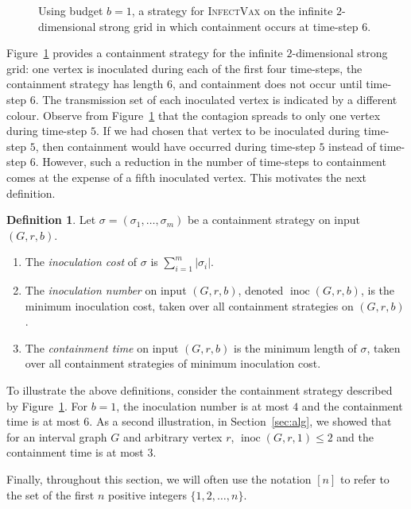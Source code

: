 \documentclass[unknownkeysallowed]{article}
\theoremstyle{definition}\newtheorem{strategy}{Strategy}
\newtheorem{definition}[theorem]{Definition}
\theoremstyle{definition}\newtheorem{notation}{Notation}[theorem]
\newcommand*{\IV}{\textup{\textsc{InfectVax}}\xspace}
\DeclareMathOperator{\inoc}{inoc}
\begin{document}
\begin{figure}[htb]
\begin{center}
\begin{tikzpicture}[line cap=round, line join=round,scale=0.7]
  

\end{tikzpicture}
\end{center}
\caption{Using budget $b=1$, a strategy for \IV on the infinite $2$-dimensional strong grid in which containment occurs at time-step $6$.} 
\label{fig:StrongGrid}
\end{figure} 
  
Figure~\ref{fig:StrongGrid} provides a containment strategy for the infinite $2$-dimensional strong grid: one vertex is inoculated during each of the first four time-steps, the containment strategy has length $6$, and containment does not occur until time-step $6$. The transmission set of each inoculated vertex is indicated by a different colour.
Observe from Figure~\ref{fig:StrongGrid} that the contagion spreads to only one vertex during time-step $5$.  If we had chosen that vertex to be inoculated during time-step $5$, then containment would have occurred during time-step $5$ instead of time-step $6$.  However, such a reduction in the number of time-steps to containment comes at the expense of a fifth inoculated vertex.  This motivates the next definition. 

\begin{definition}  
Let $\sigma=(\sigma_1,\dots,\sigma_m)$ be a containment strategy on input $(G,r,b)$. 
\begin{enumerate}
\item The {\it inoculation cost} of $\sigma$ is $\sum_{i=1}^m |\sigma_i|$.
\item The {\it inoculation number} on input $(G,r,b)$, denoted $\inoc(G,r,b)$, is the minimum inoculation cost, taken over all containment strategies on $(G,r,b)$.
\item The {\it containment time} on input $(G,r,b)$ is the minimum length of $\sigma$, taken over all  containment strategies of minimum inoculation cost.
\end{enumerate}
\end{definition}

To illustrate the above definitions, consider the containment strategy described by  Figure~\ref{fig:StrongGrid}.  For $b=1$, the inoculation number is at most $4$ and the containment time is at most $6$. As a second illustration, in Section~\ref{sec:alg}, we showed that for an interval graph $G$ and arbitrary vertex $r$, $\inoc(G,r,1) \leq 2$ and the containment time is at most 3.


\medskip

Finally, throughout this section, we will often use the notation $[n]$ to refer to the set of the first $n$ positive integers $\{1,2,\dots,n\}$.
 
\end{document}
